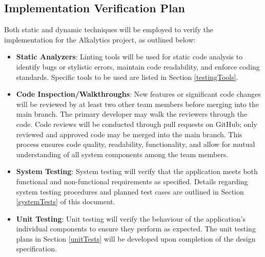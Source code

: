 \documentclass[12pt, titlepage]{article}
\begin{document}
\subsection{Implementation Verification Plan}
Both static and dynamic techniques will be employed to verify the implementation
for the Alkalytics project, as outlined below:
\begin{itemize}
  \item \textbf{Static Analyzers}: Linting tools will be used for static code
  analysis to identify bugs or stylistic errors, maintain code readability, and
  enforce coding standards. Specific tools to be used are listed in Section
  \ref{testingTools}.
  \item \textbf{Code Inspection/Walkthroughs}: New features or significant code
  changes will be reviewed by at least two other team members before merging
  into the main branch. The primary developer may walk the reviewers through the
  code. Code reviews will be conducted through pull requests on GitHub; only
  reviewed and approved code may be merged into the main branch. This process
  ensures code quality, readability, functionality, and allow for mutual
  understanding of all system components among the team members.
  \item \textbf{System Testing}: System testing will verify that the application
  meets both functional and non-functional requirements as specified. Details
  regarding system testing procedures and planned test cases are outlined in
  Section \ref{systemTests} of this document.
  \item \textbf{Unit Testing}: Unit testing will verify the behaviour of the
  application's individual components to ensure they perform as expected. The
  unit testing plans in Section \ref{unitTests} will be developed upon
  completion of the design specification.
\end{itemize}
\end{document}
